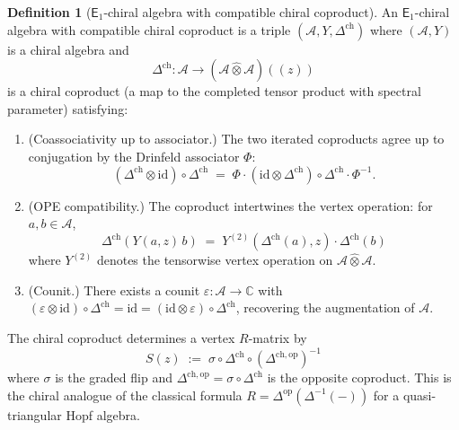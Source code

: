 \documentclass[11pt,reqno]{amsart}
\theoremstyle{definition}
\newtheorem{definition}[theorem]{Definition}
\theoremstyle{remark}
\newcommand{\cA}{\mathcal{A}}
\newcommand{\Eone}{\mathsf{E}_{1}}
\newcommand{\CC}{\mathbb{C}}
\newcommand{\id}{\mathrm{id}}
\newcommand{\op}{\mathrm{op}}
\numberwithin{equation}{section}
\begin{document}
\begin{definition}[$\Eone$-chiral algebra with compatible
chiral coproduct]
\label{def:chiral-coproduct}
An $\Eone$-chiral algebra with compatible chiral coproduct
is a triple $(\cA, Y, \Delta^{\mathrm{ch}})$ where
$(\cA, Y)$ is a chiral algebra and
\begin{equation}\label{eq:chiral-coprod}
  \Delta^{\mathrm{ch}} \colon
  \cA
  \longrightarrow
  (\cA \mathbin{\hat{\otimes}} \cA)((z))
\end{equation}
is a chiral coproduct \textup{(}a map to the completed
tensor product with spectral parameter\textup{)} satisfying:
\begin{enumerate}[label=\textup{(\roman*)}]
\item \textup{(Coassociativity up to associator.)}
  The two iterated coproducts agree up to conjugation by
  the Drinfeld associator $\Phi$:
  \begin{equation}\label{eq:coassoc}
    (\Delta^{\mathrm{ch}} \otimes \id)
    \circ \Delta^{\mathrm{ch}}
    \;=\; \Phi \cdot
    (\id \otimes \Delta^{\mathrm{ch}})
    \circ \Delta^{\mathrm{ch}}
    \cdot \Phi^{-1}.
  \end{equation}
\item \textup{(OPE compatibility.)} The coproduct
  intertwines the vertex operation:
  for $a, b \in \cA$,
  \begin{equation}\label{eq:ope-compat}
    \Delta^{\mathrm{ch}}(Y(a,z)\, b)
    \;=\;
    Y^{(2)}(\Delta^{\mathrm{ch}}(a), z)
    \cdot \Delta^{\mathrm{ch}}(b)
  \end{equation}
  where $Y^{(2)}$ denotes the tensorwise vertex
  operation on $\cA \mathbin{\hat{\otimes}} \cA$.
\item \textup{(Counit.)} There exists a counit
  $\varepsilon \colon \cA \to \CC$ with
  $(\varepsilon \otimes \id) \circ \Delta^{\mathrm{ch}}
  = \id = (\id \otimes \varepsilon) \circ
  \Delta^{\mathrm{ch}}$, recovering the augmentation of
  $\cA$.
\end{enumerate}
The chiral coproduct determines a vertex $R$-matrix by
\begin{equation}\label{eq:r-from-coprod}
  S(z)
  \;:=\; \sigma \circ \Delta^{\mathrm{ch}}
  \circ (\Delta^{\mathrm{ch},\op})^{-1}
\end{equation}
where $\sigma$ is the graded flip and
$\Delta^{\mathrm{ch},\op}
= \sigma \circ \Delta^{\mathrm{ch}}$ is the opposite
coproduct. This is the chiral analogue of the classical
formula $R = \Delta^{\op}(\Delta^{-1}(-))$ for a
quasi-triangular Hopf algebra.
\end{definition}
\end{document}
